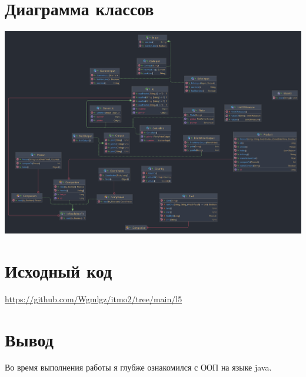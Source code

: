 \documentclass{article}
\begin{document}
\section*{Диаграмма классов}

\begin{center}
  \includegraphics[scale=0.15]{diagram.png}
\end{center}

\section*{Исходный код}
\url{https://github.com/Wgmlgz/itmo2/tree/main/l5}

\section*{Вывод}
Во время выполнения работы я глубже ознакомился с ООП на языке java.
\end{document}
